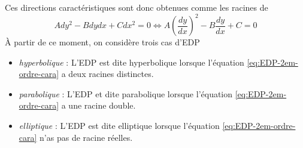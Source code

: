 Ces directions caractéristiques sont donc obtenues comme les racines de 
\begin{equation}
A dy^2 - B dy dx + C dx^2 = 0 \Leftrightarrow A \left(\frac{dy}{dx}\right)^2-B\frac{dy}{dx}+C = 0
\label{eq:EDP-2em-ordre-cara}
\end{equation}
À partir de ce moment, on considère trois cas d'EDP
\begin{itemize}
\item \emph{hyperbolique} : L'EDP est dite hyperbolique lorsque l'équation \ref{eq:EDP-2em-ordre-cara} a deux racines distinctes.
\item \emph{parabolique} : L'EDP et dite parabolique lorsque l'équation \ref{eq:EDP-2em-ordre-cara} a une racine double.
\item \emph{elliptique} : L'EDP est dite elliptique lorsque l'équation \ref{eq:EDP-2em-ordre-cara} n'as pas de racine réelles.

\end{itemize}
